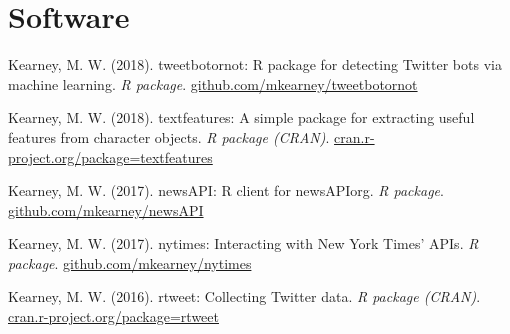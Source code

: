 \section{Software}
\begin{bibenum}

\item Kearney, M. W. (2018). tweetbotornot: R package for detecting Twitter bots via machine learning.
\textit{R package}.
\href{https://github.com/mkearney/tweetbotornot}{github.com/mkearney/tweetbotornot}

\item Kearney, M. W. (2018). textfeatures: A simple package for extracting useful features from character objects.
\textit{R package (CRAN)}.
\href{http://cran.r-project.org/package=textfeatures}{cran.r-project.org/package=textfeatures}

\item Kearney, M. W. (2017). newsAPI: R client for newsAPIorg.
\textit{R package}.
\href{https://github.com/mkearney/newsAPI}{github.com/mkearney/newsAPI}

\item Kearney, M. W. (2017). nytimes: Interacting with New York Times' APIs.
\textit{R package}.
\href{https://github.com/mkearney/nytimes}{github.com/mkearney/nytimes}

\item Kearney, M. W. (2016). rtweet: Collecting Twitter data.
\textit{R package (CRAN)}.
\href{http://cran.r-project.org/package=rtweet}{cran.r-project.org/package=rtweet}
\end{bibenum}
